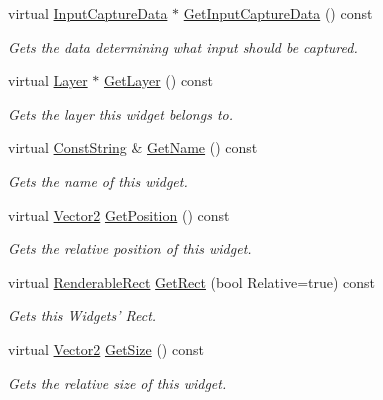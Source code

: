 \begin{DoxyCompactItemize}
virtual \hyperlink{classMezzanine_1_1UI_1_1InputCaptureData}{InputCaptureData} $\ast$ \hyperlink{classMezzanine_1_1UI_1_1Widget_a7aa4803d32b18d8f5d9550942b2acfe2}{GetInputCaptureData} () const 
\begin{DoxyCompactList}\small\item\em Gets the data determining what input should be captured. \item\end{DoxyCompactList}\item 
virtual \hyperlink{classMezzanine_1_1UI_1_1Layer}{Layer} $\ast$ \hyperlink{classMezzanine_1_1UI_1_1Widget_a33ff8bd7663738501c9ee895e08a236b}{GetLayer} () const 
\begin{DoxyCompactList}\small\item\em Gets the layer this widget belongs to. \item\end{DoxyCompactList}\item 
virtual \hyperlink{namespaceMezzanine_a63cd699ac54b73953f35ec9cfc05e506}{ConstString} \& \hyperlink{classMezzanine_1_1UI_1_1Widget_abcd2c0e80a7766524eeb63f6972baff7}{GetName} () const 
\begin{DoxyCompactList}\small\item\em Gets the name of this widget. \item\end{DoxyCompactList}\item 
virtual \hyperlink{classMezzanine_1_1Vector2}{Vector2} \hyperlink{classMezzanine_1_1UI_1_1Widget_ab498fab9f2b18236a301faa0aed9cb0d}{GetPosition} () const 
\begin{DoxyCompactList}\small\item\em Gets the relative position of this widget. \item\end{DoxyCompactList}\item 
virtual \hyperlink{structMezzanine_1_1UI_1_1RenderableRect}{RenderableRect} \hyperlink{classMezzanine_1_1UI_1_1Widget_a4a3de058cf3a274be9e8e1fb765da7e6}{GetRect} (bool Relative=true) const 
\begin{DoxyCompactList}\small\item\em Gets this Widgets' Rect. \item\end{DoxyCompactList}\item 
virtual \hyperlink{classMezzanine_1_1Vector2}{Vector2} \hyperlink{classMezzanine_1_1UI_1_1Widget_adb7eb8aae00798321f74d8174027d3c1}{GetSize} () const 
\begin{DoxyCompactList}\small\item\em Gets the relative size of this widget. \item\end{DoxyCompactList}\item 

\end{DoxyCompactItemize}
